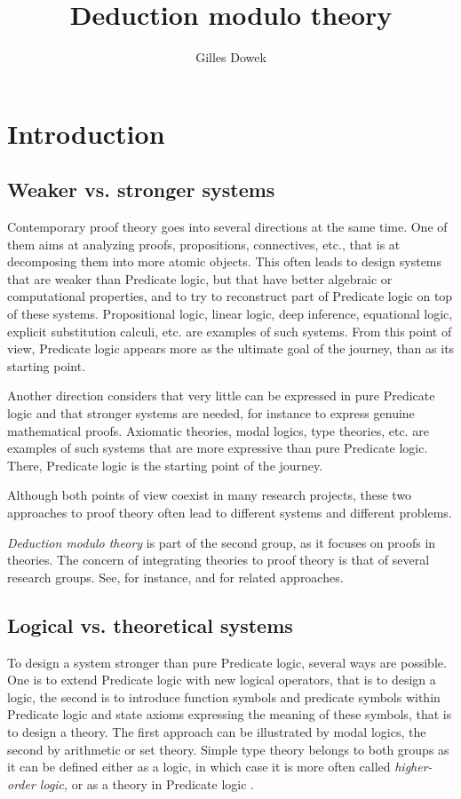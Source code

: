 \documentclass{llncs}
\title{Deduction modulo theory}
\author{Gilles Dowek}
\institute{Inria, 23 avenue d'Italie, CS 81321, 75214 Paris Cedex 13, France.\\
 \email{gilles.dowek@inria.fr}}
\begin{document}
\maketitle

\section{Introduction}

\subsection{Weaker vs. stronger systems}

Contemporary proof theory goes into several directions at the same time.
One of them aims at analyzing proofs,
propositions, connectives, etc., that is at decomposing them
into more atomic objects.  This often leads to design systems that are
weaker than Predicate logic, but that have better algebraic or
computational properties, and to try to reconstruct part of Predicate
logic on top of these systems.  Propositional logic, linear logic,
deep inference, equational logic, explicit substitution calculi,
etc. are examples of such systems.  From this point of view, Predicate
logic appears more as the ultimate goal of the journey, than as its
starting point.

Another direction considers that very little can be expressed in pure
Predicate logic and that stronger systems are needed, for instance to
express genuine mathematical proofs. Axiomatic theories, modal logics,
type theories, etc. are examples of such systems that are more
expressive than pure Predicate logic.  
There, Predicate logic is the starting point of the journey.

Although both points of view coexist in many research projects, these
two approaches to proof theory often lead to different systems
and different problems.

{\em Deduction modulo theory} is part of the second group, as it
focuses on proofs in theories. The concern of integrating theories
to proof theory is that of several research groups. See, for
instance, \cite{NegriPlato} and \cite{Naibo} for related approaches.

\subsection{Logical vs. theoretical systems}

To design a system stronger than pure Predicate logic, several ways
are possible. One is to extend Predicate logic with new logical
operators, that is to design a logic, the second is to 
introduce function symbols and predicate symbols
within Predicate logic and state axioms expressing the meaning of these
symbols, that is to design a theory. The first approach can be
illustrated by modal logics, the second by arithmetic or set
theory. Simple type theory belongs to both groups as it
can be defined either as a logic, in which
case it is more often called {\em higher-order logic}, or as a theory in
Predicate logic \cite{DowekSkolemization}.
\end{document}
